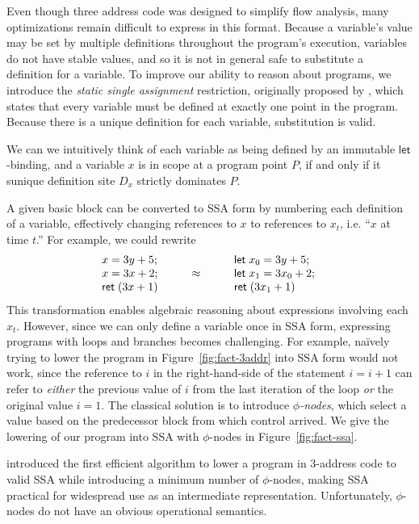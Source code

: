 \documentclass[acmsmall,screen,review]{acmart}
\newcommand{\ms}[1]{\ensuremath{\mathsf{#1}}}
\newcommand{\letexpr}[3]{\ensuremath{\ms{let}\;#1 = #2;\;#3}}
\begin{document}
Even though three address code was designed to simplify flow analysis, many optimizations remain
difficult to express in this format. Because a variable's value may be set by multiple definitions
throughout the program's execution, variables do not have stable values, and so it is not in general
safe to substitute a definition for a variable. To improve our ability to reason about programs, we
introduce the \emph{static single assignment} restriction, originally proposed by
\citet{alpern-ssa-original-88}, which states that every variable must be defined at exactly one
point in the program. Because there is a unique definition for each variable, substitution is valid.

We can we  intuitively think of each variable as being defined by an immutable \ms{let}-binding, and
a variable $x$ is in scope at a program point $P$, if and only if it sunique definition site $D_x$
strictly dominates $P$.

A given basic block can be converted to SSA form by numbering each definition of a variable,
effectively changing references to $x$ to references to $x_t$, i.e. ``$x$ at time $t$.'' For
example, we could rewrite
\begin{equation*}
\begin{array}{lcl}
  x = 3y + 5; & & \letexpr{x_0}{3y + 5}{}  \\
  x = 3x + 2; & \qquad \approx \qquad & \letexpr{x_1}{3x_0 + 2} \\
  \ms{ret}\;(3x + 1) & & \ms{ret}\;(3x_1 + 1)
\end{array}
\end{equation*}
This transformation enables algebraic reasoning about expressions involving each $x_t$. However,
since we can only define a variable once in SSA form, expressing programs with loops and branches
becomes challenging. For example, na\"ively trying to lower the program in
Figure~\ref{fig:fact-3addr} into SSA form would not work, since the reference to $i$ in the
right-hand-side of the statement $i = i + 1$ can refer to \emph{either} the previous value of $i$
from the last iteration of the loop \emph{or} the original value $i = 1$. The classical solution is
to introduce \emph{$\phi$-nodes}, which select a value based on the predecessor block from which
control arrived. We give the lowering of our program into SSA with $\phi$-nodes in
Figure~\ref{fig:fact-ssa}.

\citet{cytron-ssa-intro-91} introduced the first efficient algorithm to lower a program in 3-address
code to valid SSA while introducing a minimum number of $\phi$-nodes, making SSA practical for
widespread use as an intermediate representation. Unfortunately, $\phi$-nodes do not have an obvious
operational semantics.
\end{document}
